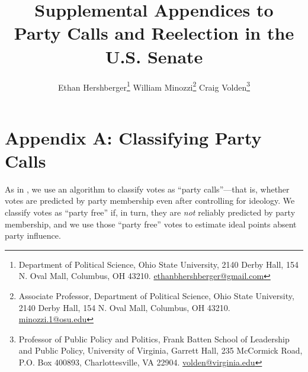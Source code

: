 \documentclass[12pt]{article}
\begin{document}
\doublespacing

\setcounter{page}{0}

\title{
{\Large Supplemental Appendices to\\}
{\LARGE Party Calls and Reelection in the U.S. Senate}}

\author{\large
Ethan Hershberger\footnote{
  \footnotesize Department of Political Science,
  Ohio State University, 2140 Derby Hall, 154 N. Oval Mall, Columbus, OH 43210.
  \href{mailto:ethanbhershberger@gmail.com}{ethanbhershberger@gmail.com}
}\quad
William Minozzi\footnote{
  \footnotesize Associate Professor, Department of Political Science,
  Ohio State University, 2140 Derby Hall, 154 N. Oval Mall, Columbus, OH 43210.
  \href{mailto:minozzi.1@osu.edu}{minozzi.1@osu.edu}
}\quad
Craig Volden\footnote{
  \footnotesize Professor of Public Policy and Politics, Frank Batten School of
  Leadership and Public Policy,
  University of Virginia, Garrett Hall, 235 McCormick Road, P.O. Box 400893,
  Charlottesville, VA 22904.
  \href{mailto:volden@virginia.edu}{volden@virginia.edu}
}\\
}

\maketitle

\thispagestyle{empty}

\setcounter{tocdepth}{1}
\setcounter{secnumdepth}{0}
\tableofcontents

\renewcommand\thetable{A\arabic{table}}
\renewcommand\thepage{A\arabic{page}}

\clearpage

\section*{Appendix A: Classifying Party Calls}
%

As in \cite{Minozzi:2013}, we use an algorithm to classify votes as
``party calls''---that is, whether votes are predicted by party membership even
after controlling for ideology.
We classify votes as ``party free'' if, in turn, they are \textit{not} reliably
predicted by party membership, and we use those ``party free'' votes to
estimate ideal points absent party influence.
\end{document}
